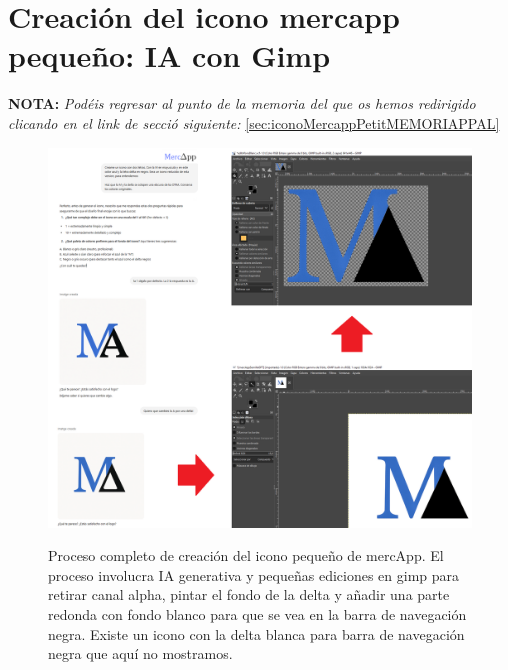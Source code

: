 \documentclass[a4paper,12pt]{report}
\begin{document}
	\pagebreak
	\section{Creación del icono mercapp pequeño: IA con Gimp}
	\label{sec:edicionMercAppIconoPequenyo}
	
	\noindent \textbf{NOTA:} \textit{Podéis regresar al punto de la memoria del que os hemos redirigido clicando en el link de secció siguiente:} \ref{sec:iconoMercappPetitMEMORIAPPAL}
	
	\FloatBarrier
	\setlength{\belowcaptionskip}{3pt}
	\begin{figure}[H]
		\centering
		\caption{Proceso completo de creación del icono pequeño de mercApp. El proceso involucra IA generativa y pequeñas ediciones en gimp para retirar canal alpha, pintar el fondo de la delta y añadir una parte redonda con fondo blanco para que se vea en la barra de navegación negra. Existe un icono con la delta blanca para barra de navegación negra que aquí no mostramos.}
		\includegraphics[width=1\linewidth]{img/edicionMercAppIconoPequenyo.png}
		\label{fig:edicionMercAppIconoPequenyo}
	\end{figure}
	\FloatBarrier
		
	
\end{document}
